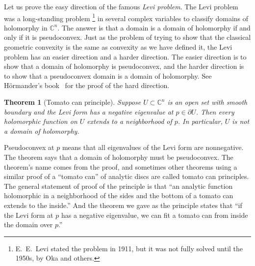 \documentclass[12pt,openany]{book}
\newcommand{\C}{{\mathbb{C}}}
\newcommand{\myindex}[1]{#1\index{#1}}
\theoremstyle{plain}
\newtheorem{thm}{Theorem}[section]
\theoremstyle{remark}
\theoremstyle{definition}
\theoremstyle{exercise}
\theoremstyle{example}
\begin{document}
\medskip


Let us prove the easy direction of the famous
\emph{\myindex{Levi problem}}.  The Levi problem was a long-standing
problem%
\footnote{E.\ E.\ Levi stated the problem in 1911, but it was not fully
solved until the 1950s, by Oka and others.}
in several complex variables to classify domains of holomorphy in
$\C^n$.  The answer is that a domain is a domain of holomorphy if and only
if it is pseudoconvex.  Just as the problem of trying to show that
the classical geometric convexity is the same as convexity as we have
defined it,
the Levi problem has an easier direction and a harder direction.
The easier direction is to show that a domain of holomorphy is pseudoconvex, and
the harder direction is to show that a pseudoconvex domain is a domain of
holomorphy.  See H\"ormander's book~\cite{Hormander} for the proof
of the hard direction.

\begin{thm}[Tomato can principle] \label{thm:tomatocan}
Suppose
$U \subset \C^n$ is an open set with smooth boundary and
the Levi form has a negative eigenvalue at $p \in
\partial U$.
Then every holomorphic function on $U$
extends to a neighborhood of $p$.
In particular, $U$ is not
a domain of holomorphy.
\end{thm}

Pseudoconvex at $p$ means that all eigenvalues of the Levi form are
nonnegative.
The theorem says that a domain of holomorphy must be pseudoconvex.
The theorem's name comes from the proof, and sometimes other theorems using a
similar proof of a ``tomato can'' of analytic discs are called
tomato can principles.
The general statement of proof of the principle is that ``an
analytic function holomorphic in a neighborhood of the sides and the bottom
of a tomato can extends to the inside.''  And the theorem we gave as
the principle states that ``if the Levi form at $p$ has a negative
eigenvalue, we can fit a tomato can from inside the domain over $p$.''
\end{document}
